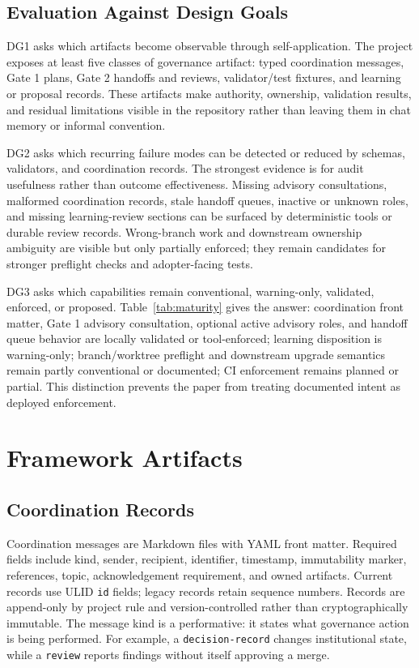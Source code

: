 \documentclass[conference]{IEEEtran}
\begin{document}
\subsection{Evaluation Against Design Goals}

DG1 asks which artifacts become observable through self-application. The project exposes at least five classes of governance artifact: typed coordination messages, Gate 1 plans, Gate 2 handoffs and reviews, validator/test fixtures, and learning or proposal records. These artifacts make authority, ownership, validation results, and residual limitations visible in the repository rather than leaving them in chat memory or informal convention.

DG2 asks which recurring failure modes can be detected or reduced by schemas, validators, and coordination records. The strongest evidence is for audit usefulness rather than outcome effectiveness. Missing advisory consultations, malformed coordination records, stale handoff queues, inactive or unknown roles, and missing learning-review sections can be surfaced by deterministic tools or durable review records. Wrong-branch work and downstream ownership ambiguity are visible but only partially enforced; they remain candidates for stronger preflight checks and adopter-facing tests.

DG3 asks which capabilities remain conventional, warning-only, validated, enforced, or proposed. Table~\ref{tab:maturity} gives the answer: coordination front matter, Gate 1 advisory consultation, optional active advisory roles, and handoff queue behavior are locally validated or tool-enforced; learning disposition is warning-only; branch/worktree preflight and downstream upgrade semantics remain partly conventional or documented; CI enforcement remains planned or partial. This distinction prevents the paper from treating documented intent as deployed enforcement.

\section{Framework Artifacts}

\subsection{Coordination Records}

Coordination messages are Markdown files with YAML front matter. Required fields include kind, sender, recipient, identifier, timestamp, immutability marker, references, topic, acknowledgement requirement, and owned artifacts. Current records use ULID \texttt{id} fields; legacy records retain sequence numbers. Records are append-only by project rule and version-controlled rather than cryptographically immutable. The message kind is a performative: it states what governance action is being performed. For example, a \texttt{decision-record} changes institutional state, while a \texttt{review} reports findings without itself approving a merge.
\end{document}
